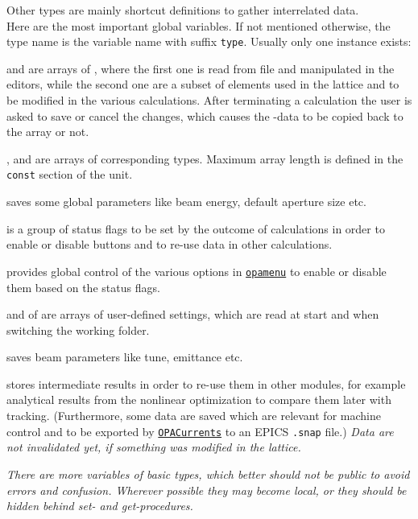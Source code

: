 \documentclass[12pt]{article}
\newcommand\code[1]{{\tt #1}}
\newcommand{\unico}[1]{{\color{burntorange}\code{#1}}}
\newcommand{\opagui}[1]{\colorbox{blue!20}{\code{#1}}}
\newcommand{\ogui}[1]{\hyperref[#1]{\opagui{#1}}}
\newcommand{\todo}[1]{{\color{red}\em #1}}
\begin{document}
{Other types are mainly shortcut definitions to gather interrelated data.\\

Here are the most important global variables. If not mentioned otherwise, the type name is the variable name with suffix \code{type}. Usually only one instance exists:

\unico{Elem} and \unico{Ella} are arrays of \unico{Elementtype}, where the first one is read from file and manipulated in the editors, while the second one are a subset of elements used in the lattice and to be modified in the various calculations. After terminating a calculation the user is asked to save or cancel the changes, which causes the \unico{Ella}-data to be copied back to the \unico{Elem} array or not.

\unico{Segm}, \unico{Lattice} and \unico{Girder} are arrays of corresponding types. Maximum array length is defined in the \code{const} section of the unit.

\unico{Glob} saves some global parameters like beam energy, default aperture size etc.

\unico{Status} is a group of status flags to be set by the outcome of calculations in order to enable or disable buttons and to re-use data in other calculations.

\unico{MainButtonHandles} provides global control of the various options in \ogui{opamenu} to enable or disable them based on the status flags.

\unico{GlobDef} and \unico{Def} of \unico{DefaultType} are arrays of user-defined settings, which are read at start and when switching the working folder. 

\unico{Beam} saves beam parameters like tune, emittance etc.

\unico{SnapSave} stores intermediate results in order to re-use them in other modules, for example analytical results from the nonlinear optimization to compare them later with tracking. (Furthermore, some data are saved which are relevant for machine control and to be exported by \ogui{OPACurrents} to an EPICS \code{.snap} file.) \todo{Data are not invalidated yet, if something was modified in the lattice.}

\todo{There are more variables of basic types, which better should not be public to avoid errors and confusion. Wherever possible they may become local, or they should be hidden behind set- and get-procedures.}

}
\end{document}
